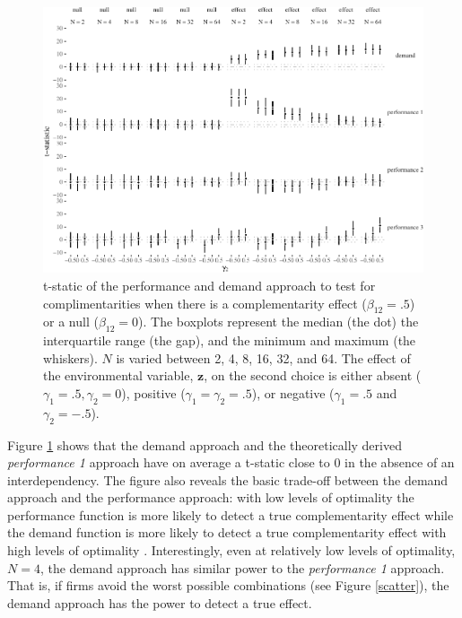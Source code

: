 \documentclass[12pt]{article}
\begin{document}
\begin{figure}

\includegraphics[width=500px]{figure-latex/unnamed-chunk-5-1}
\caption[Error Rate and Power of Demand and Performance Specification]
{\label{basic} t-static of the performance and demand approach to test
for complimentarities when there is a complementarity effect ($\beta_{12} = .5$)
or a null ($\beta_{12} = 0$). The boxplots represent the median (the dot) the
interquartile range (the gap), and the minimum and maximum (the whiskers). $N$
is varied between 2, 4, 8, 16, 32, and 64. The effect of the environmental
variable, $\mathbf{z}$, on the second choice is either absent
($\gamma_1 = .5,  \gamma_2 = 0$), positive ($\gamma_1 = \gamma_2 = .5$),
or negative ($\gamma_1 = .5$ and $\gamma_2 = -.5$).}
\end{figure}

Figure \ref{basic} shows that the demand approach and the theoretically
derived \emph{performance 1} approach have on average a t-static close
to 0 in the absence of an interdependency. The figure also reveals the
basic trade-off between the demand approach and the performance
approach: with low levels of optimality the performance function is more
likely to detect a true complementarity effect while the demand function
is more likely to detect a true complementarity effect with high levels
of optimality \citep{Grabner2013, Aral2012}. Interestingly, even at
relatively low levels of optimality, \(N = 4\), the demand approach has
similar power to the \emph{performance 1} approach. That is, if firms
avoid the worst possible combinations (see Figure \ref{scatter}), the
demand approach has the power to detect a true effect.
\end{document}
